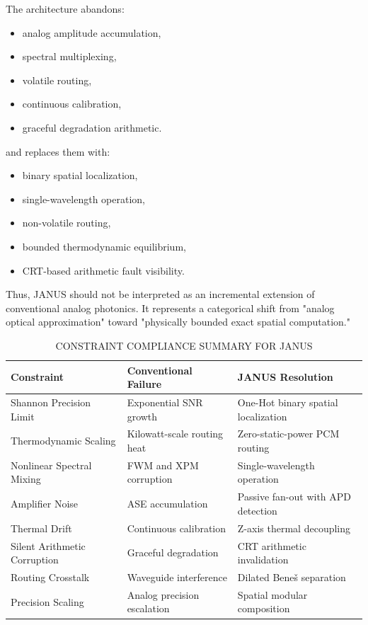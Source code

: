 \documentclass[journal]{IEEEtran}
\begin{document}
The architecture abandons:
\begin{itemize}
\item  analog amplitude accumulation,
\item  spectral multiplexing,
\item  volatile routing,
\item  continuous calibration,
\item  graceful degradation arithmetic.
\end{itemize}

and replaces them with:
\begin{itemize}
\item  binary spatial localization,
\item  single-wavelength operation,
\item  non-volatile routing,
\item  bounded thermodynamic equilibrium,
\item  CRT-based arithmetic fault visibility.
\end{itemize}

Thus, JANUS should not be interpreted as an incremental extension of conventional analog photonics. It represents a categorical shift from "analog optical approximation" toward "physically bounded exact spatial computation."

\begin{table}[htbp]
\centering
\small
\setlength{\tabcolsep}{2pt}
\caption{CONSTRAINT COMPLIANCE SUMMARY FOR JANUS}
\label{tab:table20}
\begin{tabular}{lll}
\toprule
Constraint & Conventional Failure & JANUS Resolution \\
\midrule
Shannon Precision Limit & Exponential SNR growth & One-Hot binary spatial localization \\
Thermodynamic Scaling & Kilowatt-scale routing heat & Zero-static-power PCM routing \\
Nonlinear Spectral Mixing & FWM and XPM corruption & Single-wavelength operation \\
Amplifier Noise & ASE accumulation & Passive fan-out with APD detection \\
Thermal Drift & Continuous calibration & Z-axis thermal decoupling \\
Silent Arithmetic Corruption & Graceful degradation & CRT arithmetic invalidation \\
Routing Crosstalk & Waveguide interference & Dilated Bene\v{s} separation \\
Precision Scaling & Analog precision escalation & Spatial modular composition \\
\bottomrule
\end{tabular}
\end{table}
\end{document}
